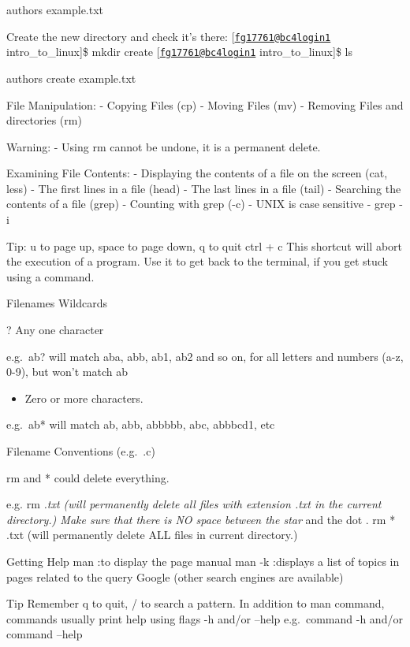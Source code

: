 \documentclass[
]{article}
\providecommand{\tightlist}{%
  \setlength{\itemsep}{0pt}\setlength{\parskip}{0pt}}
\begin{document}
authors example.txt

Create the new directory and check it's there:
{[}\href{mailto:fg17761@bc4login1}{\nolinkurl{fg17761@bc4login1}}
intro\_to\_linux{]}\$ mkdir create
{[}\href{mailto:fg17761@bc4login1}{\nolinkurl{fg17761@bc4login1}}
intro\_to\_linux{]}\$ ls

authors create example.txt

File Manipulation: - Copying Files (cp) - Moving Files (mv) - Removing
Files and directories (rm)

Warning: - Using rm cannot be undone, it is a permanent delete.

Examining File Contents: - Displaying the contents of a file on the
screen (cat, less) - The first lines in a file (head) - The last lines
in a file (tail) - Searching the contents of a file (grep) - Counting
with grep (-c) - UNIX is case sensitive - grep -i

Tip: u to page up, space to page down, q to quit ctrl + c This shortcut
will abort the execution of a program. Use it to get back to the
terminal, if you get stuck using a command.

Filenames Wildcards

? Any one character

e.g.~ab? will match aba, abb, ab1, ab2 and so on, for all letters and
numbers (a-z, 0-9), but won't match ab

\begin{itemize}
\tightlist
\item
  Zero or more characters.
\end{itemize}

e.g.~ab* will match ab, abb, abbbbb, abc, abbbcd1, etc

Filename Conventions (e.g.~.c)

rm and * could delete everything.

e.g. rm \emph{.txt (will permanently delete all files with extension
.txt in the current directory.) Make sure that there is NO space between
the star } and the dot . rm * .txt (will permanently delete ALL files in
current directory.)

Getting Help man :to display the page manual man -k :displays a list of
topics in pages related to the query Google (other search engines are
available)

Tip Remember q to quit, / to search a pattern. In addition to man
command, commands usually print help using flags -h and/or --help
e.g.~command -h and/or command --help
\end{document}

